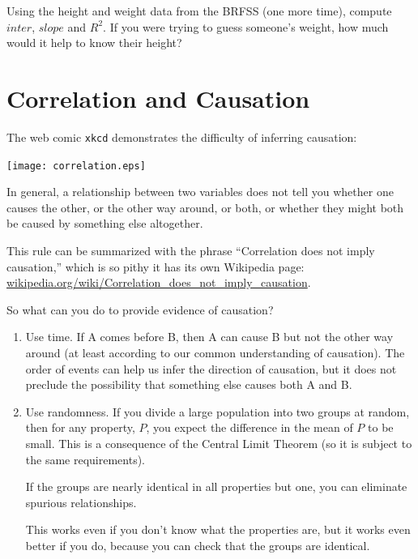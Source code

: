 \documentclass[12pt]{book}
\begin{document}
\begin{ex}

Using the height and weight data from the BRFSS (one more time),
compute $inter$, $slope$ and $R^2$.  If you were trying to guess
someone's weight, how much would it help to know their height?

\end{ex}


\section{Correlation and Causation}

The web comic {\tt xkcd} demonstrates the difficulty of inferring
causation:

\vspace{0.1in}
\centerline{\texttt{[image: correlation.eps]}}

In general, a relationship between two variables does not tell you
whether one causes the other, or the other way around, or both, or
whether they might both be caused by something else altogether.

This rule can be summarized with the phrase ``Correlation
does not imply causation,'' which is so pithy it has its own
Wikipedia page: \url{wikipedia.org/wiki/Correlation_does_not_imply_causation}.

So what can you do to provide evidence of causation?

\begin{enumerate}

\item Use time.  If A comes before B, then A can cause B but not the
  other way around (at least according to our common understanding of
  causation).  The order of events can help us infer the direction
  of causation, but it does not preclude the possibility that something
  else causes both A and B.

\item Use randomness.  If you divide a large population into two
  groups at random, then for any property, $P$, you expect the
  difference in the mean of $P$ to be small.  This is a consequence
  of the Central Limit Theorem (so it is subject to the same
  requirements).

  If the groups are nearly identical in all properties but one, you
  can eliminate spurious relationships.

  This works even if you don't know what the properties
  are, but it works even better if you do, because you can check that
  the groups are identical.

\end{enumerate}
\end{document}
